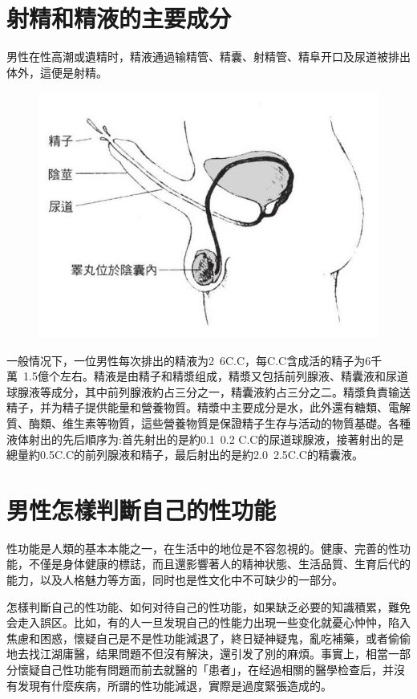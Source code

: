 \documentclass[12pt,UTF8]{ctexbook}
\begin{document}
\section{射精和精液的主要成分}

男性在性高潮或遺精时，精液通過输精管、精囊、射精管、精阜开口及尿道被排出体外，這便是射精。

\begin{figure}[htbp]
	\centering
	\includegraphics[width=0.7\linewidth]{5}
	\caption{}
\end{figure}

一般情况下，一位男性每次排出的精液为2~6C.C，每C.C含成活的精子为6千萬~1.5億个左右。精液是由精子和精漿组成，精漿又包括前列腺液、精囊液和尿道球腺液等成分，其中前列腺液約占三分之一，精囊液約占三分之二。精漿負責输送精子，并为精子提供能量和營養物質。精漿中主要成分是水，此外還有糖類、電解質、酶類、维生素等物質，這些營養物質是保證精子生存与活动的物質基礎。各種液体射出的先后順序为:首先射出的是約0.1~0.2 C.C的尿道球腺液，接著射出的是總量約0.5C.C的前列腺液和精子，最后射出的是約2.0~2.5C.C的精囊液。

\section{男性怎樣判斷自己的性功能}

性功能是人類的基本本能之一，在生活中的地位是不容忽視的。健康、完善的性功能，不僅是身体健康的標誌，而且還影響著人的精神状態、生活品質、生育后代的能力，以及人格魅力等方面，同时也是性文化中不可缺少的一部分。

怎樣判斷自己的性功能、如何对待自己的性功能，如果缺乏必要的知識積累，難免会走入誤区。比如，有的人一旦发現自己的性能力出現一些变化就憂心忡忡，陷入焦慮和困惑，懷疑自己是不是性功能減退了，終日疑神疑鬼，亂吃補藥，或者偷偷地去找江湖庸醫，结果問題不但沒有解決，還引发了別的麻煩。事實上，相當一部分懷疑自己性功能有問題而前去就醫的「患者」，在经過相關的醫學检查后，并沒有发現有什麼疾病，所謂的性功能減退，實際是過度緊張造成的。
\end{document}
